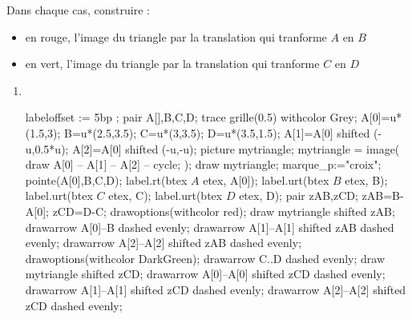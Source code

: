\begin{corrige}
    Dans chaque cas, construire :
    \begin{itemize}
        \item en rouge, l'image du triangle par la translation qui tranforme $A$ en $B$
        \item en vert, l'image du triangle par la translation qui tranforme $C$ en $D$
    \end{itemize}
    \begin{changemargin}{-15mm}{0mm}
        \begin{multicols}{2}
            \begin{enumerate}
                \item \phantom{rrr}\\
                \begin{Geometrie}[CoinHD={(4u,4u)}]
                    labeloffset := 5bp ;
                    pair A[],B,C,D;                    
                    trace grille(0.5) withcolor Grey;
                    A[0]=u*(1.5,3);
                    B=u*(2.5,3.5);
                    C=u*(3,3.5);
                    D=u*(3.5,1.5);
                    A[1]=A[0] shifted (-u,0.5*u);
                    A[2]=A[0] shifted (-u,-u);
                    picture mytriangle;
                    mytriangle = image( 
                        draw A[0] -- A[1] -- A[2] -- cycle;
                    );
                    draw mytriangle;
                    marque_p:="croix";
                    pointe(A[0],B,C,D);
                    label.rt(btex $A$ etex, A[0]);
                    label.urt(btex $B$ etex, B);
                    label.urt(btex $C$ etex, C);
                    label.urt(btex $D$ etex, D);
                    pair zAB,zCD;
                    zAB=B-A[0];
                    zCD=D-C;
                    drawoptions(withcolor red);
                    draw mytriangle shifted zAB;
                    drawarrow A[0]--B dashed evenly;
                    drawarrow A[1]--A[1] shifted zAB dashed evenly;
                    drawarrow A[2]--A[2] shifted zAB dashed evenly;
                    drawoptions(withcolor DarkGreen);
                    drawarrow C..D dashed evenly;
                    draw mytriangle shifted zCD;
                    drawarrow A[0]--A[0] shifted zCD dashed evenly;
                    drawarrow A[1]--A[1] shifted zCD dashed evenly;
                    drawarrow A[2]--A[2] shifted zCD dashed evenly;

\end{Geometrie}
\end{enumerate}
\end{multicols}
\end{changemargin}
\end{corrige}
